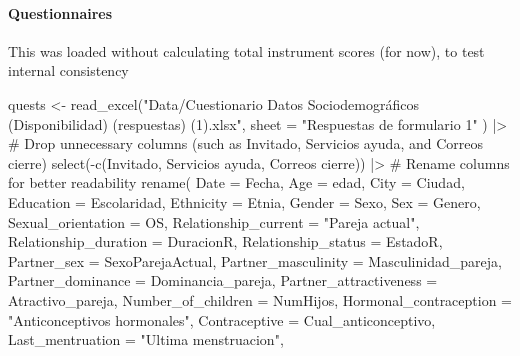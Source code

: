 \documentclass[
  bookmarksnumbered]{article}
\newenvironment{Shaded}{\begin{snugshade}}{\end{snugshade}}
\newcommand{\AttributeTok}[1]{\textcolor[rgb]{0.80,0.80,0.80}{#1}}
\newcommand{\CommentTok}[1]{\textcolor[rgb]{0.50,0.62,0.50}{#1}}
\newcommand{\FunctionTok}[1]{\textcolor[rgb]{0.94,0.94,0.56}{#1}}
\newcommand{\NormalTok}[1]{\textcolor[rgb]{0.80,0.80,0.80}{#1}}
\newcommand{\OtherTok}[1]{\textcolor[rgb]{0.94,0.94,0.56}{#1}}
\newcommand{\SpecialCharTok}[1]{\textcolor[rgb]{0.86,0.64,0.64}{#1}}
\newcommand{\StringTok}[1]{\textcolor[rgb]{0.80,0.58,0.58}{#1}}
\begin{document}
\paragraph{Questionnaires}\label{questionnaires}

This was loaded without calculating total instrument scores (for now), to test internal consistency

\begin{Shaded}
\begin{Highlighting}[]
\NormalTok{quests }\OtherTok{\textless{}{-}} \FunctionTok{read\_excel}\NormalTok{(}\StringTok{"Data/Cuestionario Datos Sociodemográficos  (Disponibilidad) (respuestas) (1).xlsx"}\NormalTok{,}
                     \AttributeTok{sheet =} \StringTok{"Respuestas de formulario 1"}
\NormalTok{) }\SpecialCharTok{|\textgreater{}}
  \CommentTok{\# Drop unnecessary columns (such as \textquotesingle{}Invitado\textquotesingle{}, \textquotesingle{}Servicios ayuda\textquotesingle{}, and \textquotesingle{}Correos cierre\textquotesingle{})}
  \FunctionTok{select}\NormalTok{(}\SpecialCharTok{{-}}\FunctionTok{c}\NormalTok{(Invitado, }\StringTok{\textasciigrave{}}\AttributeTok{Servicios ayuda}\StringTok{\textasciigrave{}}\NormalTok{, }\StringTok{\textasciigrave{}}\AttributeTok{Correos cierre}\StringTok{\textasciigrave{}}\NormalTok{)) }\SpecialCharTok{|\textgreater{}}
  \CommentTok{\# Rename columns for better readability}
  \FunctionTok{rename}\NormalTok{(}
    \AttributeTok{Date =}\NormalTok{ Fecha,}
    \AttributeTok{Age =}\NormalTok{ edad,}
    \AttributeTok{City =}\NormalTok{ Ciudad,}
    \AttributeTok{Education =}\NormalTok{ Escolaridad,}
    \AttributeTok{Ethnicity =}\NormalTok{ Etnia,}
    \AttributeTok{Gender =}\NormalTok{ Sexo,}
    \AttributeTok{Sex =}\NormalTok{ Genero,}
    \AttributeTok{Sexual\_orientation =}\NormalTok{ OS,}
    \AttributeTok{Relationship\_current =} \StringTok{"Pareja actual"}\NormalTok{,}
    \AttributeTok{Relationship\_duration =}\NormalTok{ DuracionR,}
    \AttributeTok{Relationship\_status =}\NormalTok{ EstadoR,}
    \AttributeTok{Partner\_sex =}\NormalTok{ SexoParejaActual,}
    \AttributeTok{Partner\_masculinity =}\NormalTok{ Masculinidad\_pareja,}
    \AttributeTok{Partner\_dominance =}\NormalTok{ Dominancia\_pareja,}
    \AttributeTok{Partner\_attractiveness =}\NormalTok{ Atractivo\_pareja,}
    \AttributeTok{Number\_of\_children =}\NormalTok{ NumHijos,}
    \AttributeTok{Hormonal\_contraception =} \StringTok{"Anticonceptivos hormonales"}\NormalTok{,}
    \AttributeTok{Contraceptive =}\NormalTok{ Cual\_anticonceptivo,}
    \AttributeTok{Last\_mentruation =} \StringTok{"Ultima menstruacion"}\NormalTok{,}

\end{Highlighting}
\end{Shaded}
\end{document}
